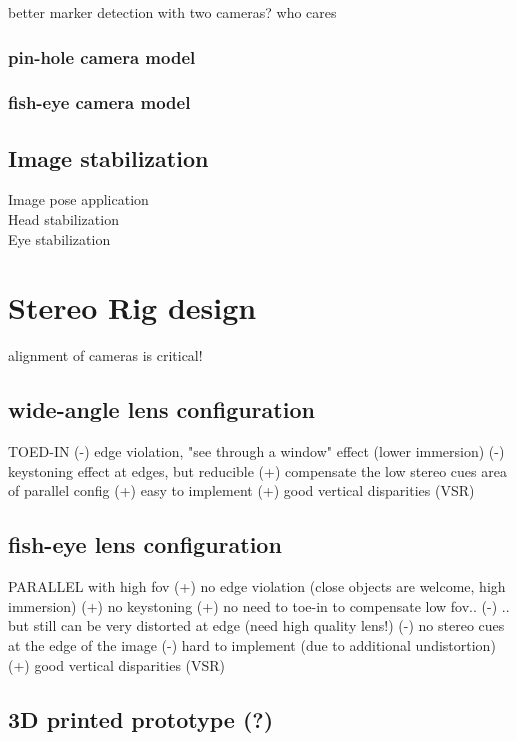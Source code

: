 better marker detection with two cameras? who cares \\



\subsubsection{pin-hole camera model}
\subsubsection{fish-eye camera model}

\subsection{Image stabilization}
Image pose application \\
Head stabilization \\
Eye stabilization \\

\section{Stereo Rig design}
alignment of cameras is critical!

\subsection{wide-angle lens configuration}
TOED-IN
(-) edge violation, "see through a window" effect (lower immersion)
(-) keystoning effect at edges, but reducible
(+) compensate the low stereo cues area of parallel config
(+) easy to implement
(+) good vertical disparities (VSR)

\subsection{fish-eye lens configuration}
PARALLEL with high fov
(+) no edge violation (close objects are welcome, high immersion)
(+) no keystoning
(+) no need to toe-in to compensate low fov..
(-) .. but still can be very distorted at edge (need high quality lens!)
(-) no stereo cues at the edge of the image
(-) hard to implement (due to additional undistortion)
(+) good vertical disparities (VSR)

\subsection{3D printed prototype (?)}


